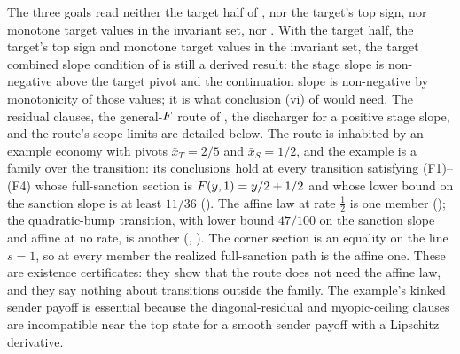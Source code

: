 The three goals read neither the target half of , nor the target's
top sign, nor monotone target values in the invariant set, nor . With the target half,
the target's top sign and monotone target values in the invariant set, the target combined
slope condition of  is still a derived result: the stage slope is
non-negative above the target pivot and the continuation slope is
non-negative by monotonicity of those values; it is what conclusion (vi) of
 would need. The residual clauses, the general-$F$ route of
, the discharger for a positive stage slope, and the route's
scope limits are detailed
below. The route is inhabited by an example economy with pivots
$\bar x_T=2/5$ and $\bar x_S=1/2$, and the example is a family over the
transition: its conclusions hold at every transition satisfying
\textup{(F1)--(F4)} whose full-sanction section is $F(y,1)=y/2+1/2$ and whose
lower bound on the sanction slope is at least $11/36$
(). The affine law at rate $\tfrac12$ is one
member (); the quadratic-bump transition, with
lower bound $47/100$ on the sanction slope and affine at no rate, is another
(, ). The
corner section is an equality on the line $s=1$, so at every member the
realized full-sanction path is the affine one. These are existence
certificates: they show that the route does not need the affine law,
and they say nothing about transitions outside the family. The example's kinked
sender payoff is
essential because the diagonal-residual and myopic-ceiling clauses are
incompatible near the top state for a smooth sender payoff with a
Lipschitz derivative.

